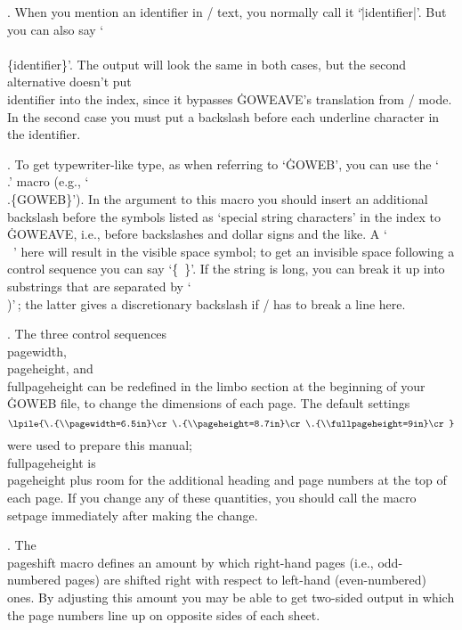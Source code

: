 . When you mention an identifier in \TEX/ text, you normally call
it `\.{|identifier|}'. But you can also say `\.{\\\\\{identifier\}}'. The
output will look the same in both cases, but the second alternative
doesn't put \\{identifier} into the index, since
it bypasses \.{GOWEAVE}'s translation from \GO/ mode. In the second
case you must put a backslash before each underline character
in the identifier.

. To get typewriter-like type, as when referring to `\.{GOWEB}', you
can use the `\.{\\.}' macro (e.g., `\.{\\.\{GOWEB\}}'). In the argument to
this macro you should insert an additional backslash before the symbols
listed as `special string characters' in the index to \.{GOWEAVE}, i.e.,
before backslashes and dollar signs and the like.
A `\.{\\\ }' here will result in the visible space symbol; to get an
invisible space following a control sequence you can say `\.{\{\ \}}'.
If the string is long, you can break it up into substrings that
are separated by `\.{\\)}'\,; the latter gives a discretionary backslash
if \TEX/ has to break a line here.

. The three control sequences \.{\\pagewidth}, \.{\\pageheight},
and \.{\\fullpageheight} can be redefined in the limbo section at the
beginning of your \.{GOWEB} file, to change the dimensions of each page.
The default settings
$$\lpile{\.{\\pagewidth=6.5in}\cr
  \.{\\pageheight=8.7in}\cr
  \.{\\fullpageheight=9in}\cr}$$
were used to prepare this manual; \.{\\fullpageheight} is
\.{\\pageheight} plus room for the additional heading and page numbers at
the top of each page. If you change any of these quantities, you should
call the macro \.{\\setpage} immediately after making the change.

. The \.{\\pageshift} macro defines an amount by which right-hand
pages (i.e., odd-numbered pages) are shifted right with respect to
left-hand (even-numbered) ones. By adjusting this amount you may be
able to get two-sided output in which the page numbers line up on
opposite sides of each sheet.


